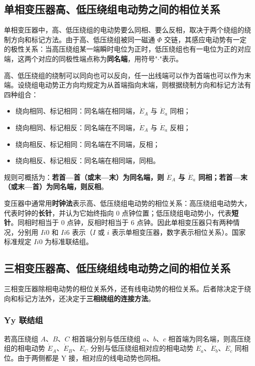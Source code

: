 \subsection{单相变压器高、低压绕组电动势之间的相位关系}
单相变压器中，高、低压绕组的电动势要么同相、要么反相，取决于两个绕组的绕制方向和标记方法。由于高、低压绕组被同一磁通 $\Phi$ 交链，其感应电动势有一定的极性关系：当高压绕组某一端瞬时电位为正时，低压绕组也有一电位为正的对应端，这两个对应的同极性端点称为\textbf{同名端}，用符号"$\cdot$"表示。

高、低压绕组的绕制可以同向也可以反向，任一出线端可以作为首端也可以作为末端。设绕组电动势正方向均规定为从首端指向末端，则根据绕制方向和标记方法有四种组合：
\begin{itemize}
  \item 绕向相同、标记相同：同名端在相同端，$\dot E_A$ 与 $\dot E_a$ 同相；
  \item 绕向相同、标记相反：同名端在不同端，$\dot E_A$ 与 $\dot E_a$ 反相；
  \item 绕向相反、标记相同：同名端在不同端，反相；
  \item 绕向相反、标记相反：同名端在相同端，同相。
\end{itemize}

规则可概括为：\textbf{若首—首（或末—末）为同名端，则 $\dot E_A$ 与 $\dot E_a$ 同相；若首—末（或末—首）为同名端，则反相}。

变压器中通常用\textbf{时钟法}表示高、低压绕组电动势的相位关系：高压绕组电动势大，代表时钟的\textbf{长针}，并认为它始终指向 0 点钟位置；低压绕组电动势小，代表\textbf{短针}。同相时相当于 0 点钟，反相时相当于 6 点钟。因此单相变压器只有两种情况，分别用 $Ii0$ 和 $Ii6$ 表示（$I$ 或 $i$ 表示单相变压器，数字表示相位关系）。国家标准规定 $Ii0$ 为标准联结组。

\subsection{三相变压器高、低压绕组线电动势之间的相位关系}
三相变压器除相电动势的相位关系外，还有线电动势的相位关系。后者除决定于绕向和标记方法外，还决定于\textbf{三相绕组的连接方法}。

\subsubsection{Yy 联结组}
若高压绕组 $A$、$B$、$C$ 相首端分别与低压绕组 $a$、$b$、$c$ 相首端为同名端，则高压绕组的相电动势 $\dot E_A$、$\dot E_B$、$\dot E_C$ 分别与低压绕组相对应的相电动势 $\dot E_a$、$\dot E_b$、$\dot E_c$ 同相位。由于两侧都是 Y 接，相对应的线电动势也同相。

